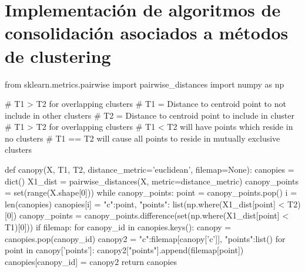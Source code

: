 \documentclass[a4paper, 12pt]{article}
\begin{document}
\newpage
\section{Implementaci\'on de algoritmos de consolidaci\'on asociados a m\'etodos de clustering}\label{App:AppendixB}

\begin{python}[caption=Preprocesado de Canopy]\label{App:Canopy}
from sklearn.metrics.pairwise import pairwise_distances
import numpy as np

# T1 > T2 for overlapping clusters
# T1 = Distance to centroid point to not include in other clusters
# T2 = Distance to centroid point to include in cluster
# T1 > T2 for overlapping clusters
# T1 < T2 will have points which reside in no clusters
# T1 == T2 will cause all points to reside in mutually exclusive clusters

def canopy(X, T1, T2, distance_metric='euclidean', filemap=None):
    canopies = dict()
    X1_dist = pairwise_distances(X, metric=distance_metric)
    canopy_points = set(range(X.shape[0]))
    while canopy_points:
        point = canopy_points.pop()
        i = len(canopies)
        canopies[i] = {"c":point, "points": list(np.where(X1_dist[point] < T2)[0])}
        canopy_points = canopy_points.difference(set(np.where(X1_dist[point] < T1)[0]))
    if filemap:
        for canopy_id in canopies.keys():
            canopy = canopies.pop(canopy_id)
            canopy2 = {"c":filemap[canopy['c']], "points":list()}
            for point in canopy['points']:
                canopy2["points"].append(filemap[point])
            canopies[canopy_id] = canopy2
    return canopies

\end{python}



\newpage
\end{document}
